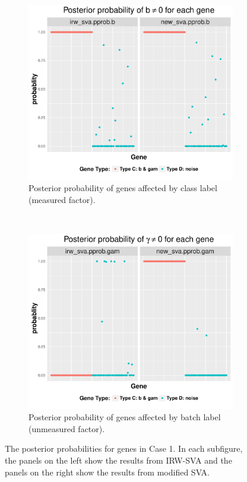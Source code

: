 \documentclass[11pt]{article}
\begin{document}
\begin{figure}[h!]
    \centering
    \begin{subfigure}[t]{0.45\textwidth}
    \centering
    \includegraphics[width = \textwidth]{figures/pprop1_2.pdf}
    \caption{Posterior probability of genes affected by class label (measured factor).}
    \label{fig:pprob1_1}
    \end{subfigure}
    ~
     \begin{subfigure}[t]{0.45\textwidth}
    \centering
    \includegraphics[width = \textwidth]{figures/pprop1_1.pdf}
    \caption{Posterior probability of genes affected by batch label (unmeasured factor).}
    \label{fig:pprob1_2}
    \end{subfigure}
    \caption{The posterior probabilities for genes in Case 1. In each subfigure, the panels on the left show the results from IRW-SVA and the panels on the right show the results from modified SVA.}
    \label{fig:visual1}
\end{figure}
\end{document}
